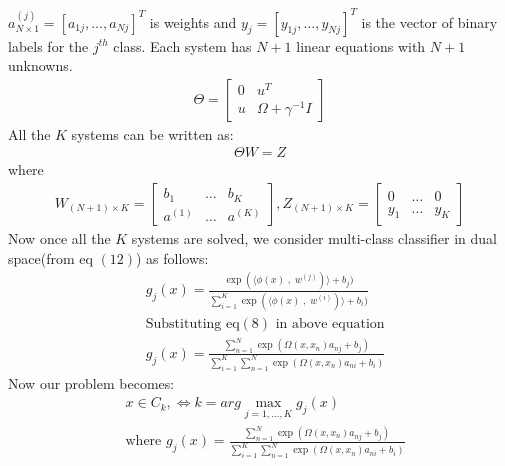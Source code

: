 \documentclass[conference]{IEEEtran}
\begin{document}
    $a^{(j)}_{N \times 1} = [a_{1j}, \ldots, a_{Nj}]^{T}$ is weights and $y_{j} = [y_{1j}, \ldots, y_{Nj}]^{T}$ is the
    vector of binary labels for the $j^{th}$ class.
    Each system has $N+1$ linear equations with $N+1$ unknowns.
    \begin{align}
        \Theta = \begin{bmatrix}
                     0 & u^{T}                 \\
                     u & \Omega + \gamma^{-1}I
        \end{bmatrix}
    \end{align}
    All the $K$ systems can be written as:
    \begin{align}
        \Theta W = Z
    \end{align}
    where
    \begin{align*}
        W_{(N+1) \times K} = \begin{bmatrix}
                                 b_{1}   & \ldots & b_{K}   \\
                                 a^{(1)} & \ldots & a^{(K)}
        \end{bmatrix}
        , Z_{(N+1) \times K} = \begin{bmatrix}
                                   0     & \ldots & 0     \\
                                   y_{1} & \ldots & y_{K}
        \end{bmatrix}
    \end{align*}
    Now once all the $K$ systems are solved, we consider multi-class classifier in dual space(from eq $(12)$) as follows:
    \begin{align*}
        &g_{j}(x) = \frac{\exp(\langle \phi(x)\;,\; w^{(j)})\rangle + b_{j})}{\sum_{i=1}^{K} \exp(\langle \phi(x)\;,\; w^{(i)})\rangle + b_{i})}\\
        &\text{Substituting eq$(8)$ in above equation} \\
        &g_{j}(x) = \frac{\sum_{n=1}^{N}\exp(\Omega(x,x_{n})a_{nj} + b_{j})}{\sum_{i=1}^{K} \sum_{n=1}^{N}\exp(\Omega(x,x_{n})a_{ni} + b_{i})}
    \end{align*}
    Now our problem becomes:
    \begin{align*}
        & x \in C_{k}, \Leftrightarrow k= arg \max_{j=1,\ldots,K} g_{j}(x)\\
        & \text{where } g_{j}(x) = \frac{\sum_{n=1}^{N}\exp(\Omega(x,x_{n})a_{nj} + b_{j})}{\sum_{i=1}^{K} \sum_{n=1}^{N}\exp(\Omega(x,x_{n})a_{ni} + b_{i})}
    \end{align*}
\end{document}
